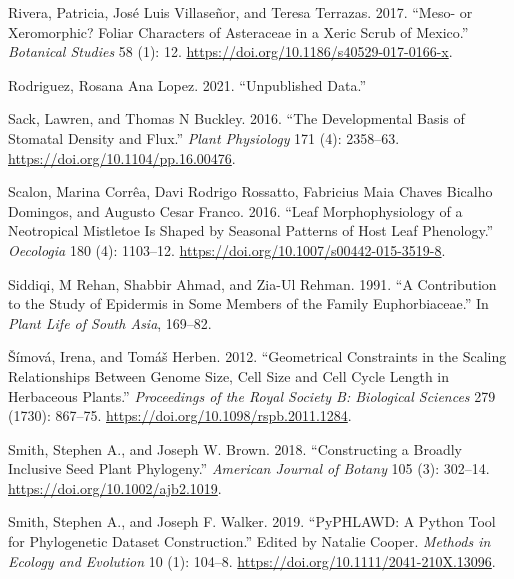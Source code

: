 \documentclass[
  12pt,
]{article}
\newlength{\cslhangindent}
\newlength{\cslentryspacingunit} %
\newenvironment{CSLReferences}[2] %
 {%
  \setlength{\parindent}{0pt}
  \ifodd #1
  \let\oldpar\par
  \def\par{\hangindent=\cslhangindent\oldpar}
  \fi
  \setlength{\parskip}{#2\cslentryspacingunit}
 }%
 {}
\begin{document}
\begin{CSLReferences}{1}{0}
\leavevmode{}%
Rivera, Patricia, José Luis Villaseñor, and Teresa Terrazas. 2017. {``Meso- or Xeromorphic? {Foliar} Characters of {Asteraceae} in a Xeric Scrub of {Mexico}.''} \emph{Botanical Studies} 58 (1): 12. \url{https://doi.org/10.1186/s40529-017-0166-x}.

\leavevmode{}%
Rodriguez, Rosana Ana Lopez. 2021. {``Unpublished Data.''}

\leavevmode{}%
Sack, Lawren, and Thomas N Buckley. 2016. {``The Developmental Basis of Stomatal Density and Flux.''} \emph{Plant Physiology} 171 (4): 2358--63. \url{https://doi.org/10.1104/pp.16.00476}.

\leavevmode{}%
Scalon, Marina Corrêa, Davi Rodrigo Rossatto, Fabricius Maia Chaves Bicalho Domingos, and Augusto Cesar Franco. 2016. {``Leaf Morphophysiology of a {Neotropical} Mistletoe Is Shaped by Seasonal Patterns of Host Leaf Phenology.''} \emph{Oecologia} 180 (4): 1103--12. \url{https://doi.org/10.1007/s00442-015-3519-8}.

\leavevmode{}%
Siddiqi, M Rehan, Shabbir Ahmad, and Zia-Ul Rehman. 1991. {``A Contribution to the Study of Epidermis in Some Members of the Family {Euphorbiaceae}.''} In \emph{Plant {Life} of {South} {Asia}}, 169--82.

\leavevmode{}%
Šímová, Irena, and Tomáš Herben. 2012. {``Geometrical Constraints in the Scaling Relationships Between Genome Size, Cell Size and Cell Cycle Length in Herbaceous Plants.''} \emph{Proceedings of the Royal Society B: Biological Sciences} 279 (1730): 867--75. \url{https://doi.org/10.1098/rspb.2011.1284}.

\leavevmode{}%
Smith, Stephen A., and Joseph W. Brown. 2018. {``Constructing a Broadly Inclusive Seed Plant Phylogeny.''} \emph{American Journal of Botany} 105 (3): 302--14. \url{https://doi.org/10.1002/ajb2.1019}.

\leavevmode{}%
Smith, Stephen A., and Joseph F. Walker. 2019. {``{PyPHLAWD}: {A} Python Tool for Phylogenetic Dataset Construction.''} Edited by Natalie Cooper. \emph{Methods in Ecology and Evolution} 10 (1): 104--8. \url{https://doi.org/10.1111/2041-210X.13096}.


\end{CSLReferences}
\end{document}
